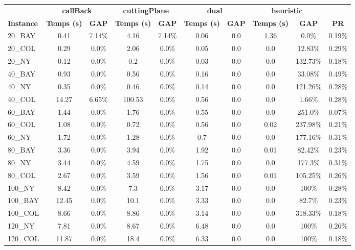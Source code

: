 \documentclass[main.tex]{subfiles}
\begin{document}
\begin{center}
\renewcommand{\arraystretch}{1.4} 
\begin{tabular}{lccccccccc}
	\hline
 & \multicolumn{2}{c}{\textbf{callBack}} & \multicolumn{2}{c}{\textbf{cuttingPlane}} & \multicolumn{2}{c}{\textbf{dual}} & \multicolumn{2}{c}{\textbf{heuristic}}\\
\textbf{Instance}  & \textbf{Temps (s)} & \textbf{GAP} & \textbf{Temps (s)} & \textbf{GAP} & \textbf{Temps (s)} & \textbf{GAP} & \textbf{Temps (s)} & \textbf{GAP} & \textbf{PR} \\\hline

20\_BAY & 0.41 & 7.14\% & 4.16 & 7.14\% & 0.06 & 0.0 & 1.36 & 0.0\% & 0.19\%\\
20\_COL & 0.29 & 0.0\% & 2.06 & 0.0\% & 0.05 & 0.0 & 0.0 & 12.83\% & 0.29\%\\
20\_NY & 0.12 & 0.0\% & 0.2 & 0.0\% & 0.03 & 0.0 & 0.0 & 132.73\% & 0.18\%\\
40\_BAY & 0.93 & 0.0\% & 0.56 & 0.0\% & 0.16 & 0.0 & 0.0 & 33.08\% & 0.49\%\\
40\_NY & 0.35 & 0.0\% & 0.46 & 0.0\% & 0.14 & 0.0 & 0.0 & 121.26\% & 0.28\%\\
40\_COL & 14.27 & 6.65\% & 100.53 & 0.0\% & 0.56 & 0.0 & 0.0 & 1.66\% & 0.28\%\\
60\_BAY & 1.44 & 0.0\% & 1.76 & 0.0\% & 0.55 & 0.0 & 0.0 & 251.0\% & 0.07\%\\
60\_COL & 1.08 & 0.0\% & 0.72 & 0.0\% & 0.56 & 0.0 & 0.02 & 237.98\% & 0.21\%\\
60\_NY & 1.72 & 0.0\% & 1.28 & 0.0\% & 0.7 & 0.0 & 0.0 & 177.16\% & 0.31\%\\
80\_BAY & 3.36 & 0.0\% & 3.94 & 0.0\% & 1.92 & 0.0 & 0.01 & 82.42\% & 0.23\%\\
80\_NY & 3.44 & 0.0\% & 4.59 & 0.0\% & 1.75 & 0.0 & 0.0 & 177.3\% & 0.31\%\\
80\_COL & 2.67 & 0.0\% & 3.59 & 0.0\% & 1.56 & 0.0 & 0.01 & 105.25\% & 0.26\%\\
100\_NY & 8.42 & 0.0\% & 7.3 & 0.0\% & 3.17 & 0.0 & 0.0 &  100\%  & 0.28\%\\
100\_BAY & 12.45 & 0.0\% & 10.1 & 0.0\% & 3.33 & 0.0 & 0.0 & 82.7\% & 0.23\%\\
100\_COL & 8.66 & 0.0\% & 8.86 & 0.0\% & 3.14 & 0.0 & 0.0 & 318.33\% & 0.18\%\\
120\_NY & 7.81 & 0.0\% & 8.67 & 0.0\% & 6.48 & 0.0 & 0.0 &  100\%  & 0.26\%\\
120\_COL & 11.87 & 0.0\% & 18.4 & 0.0\% & 6.33 & 0.0 & 0.0 &  100\%  & 0.18\%\\

\end{tabular}
\end{center}
\end{document}
